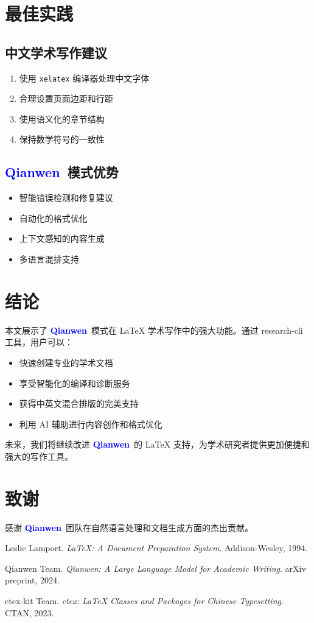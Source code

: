 \documentclass[11pt,a4paper]{article}
\newcommand{\qianwen}{\textcolor{blue}{\textbf{Qianwen}}}
\begin{document}
\section{最佳实践}

\subsection{中文学术写作建议}

\begin{enumerate}
    \item 使用 \texttt{xelatex} 编译器处理中文字体
    \item 合理设置页面边距和行距
    \item 使用语义化的章节结构
    \item 保持数学符号的一致性
\end{enumerate}

\subsection{\qianwen\ 模式优势}

\begin{itemize}
    \item 智能错误检测和修复建议
    \item 自动化的格式优化
    \item 上下文感知的内容生成
    \item 多语言混排支持
\end{itemize}

\section{结论}

本文展示了 \qianwen\ 模式在 LaTeX 学术写作中的强大功能。通过 research-cli 工具，用户可以：

\begin{itemize}
    \item 快速创建专业的学术文档
    \item 享受智能化的编译和诊断服务
    \item 获得中英文混合排版的完美支持
    \item 利用 AI 辅助进行内容创作和格式优化
\end{itemize}

未来，我们将继续改进 \qianwen\ 的 LaTeX 支持，为学术研究者提供更加便捷和强大的写作工具。

\section*{致谢}

感谢 \qianwen\ 团队在自然语言处理和文档生成方面的杰出贡献。

\begin{thebibliography}{9}
Leslie Lamport. \textit{LaTeX: A Document Preparation System}. Addison-Wesley, 1994.

Qianwen Team. \textit{Qianwen: A Large Language Model for Academic Writing}. arXiv preprint, 2024.

ctex-kit Team. \textit{ctex: LaTeX Classes and Packages for Chinese Typesetting}. CTAN, 2023.
\end{thebibliography}
\end{document}
